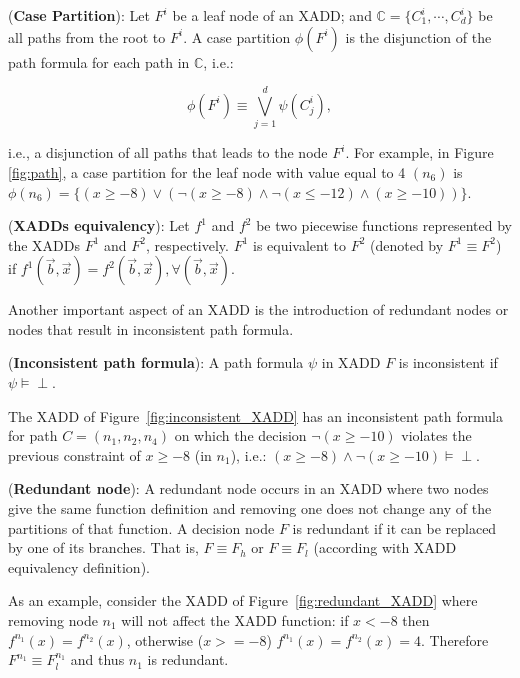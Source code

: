 \documentclass[twoside,11pt]{article}
\newenvironment{mydef}[1][Definition]{\begin{trivlist}
\item[\hskip \labelsep {\bfseries #1}]}{\end{trivlist}}
\begin{document}
\begin{mydef}(\textbf{Case Partition}): Let $F^i$ be a leaf node of an XADD; and $\mathbb{C}= \{C_1^i, \cdots, C_d^i\} $ be all paths from the root to $F^i$. A case partition $\phi(F^i)$ is the disjunction of the path formula for each path in $\mathbb{C}$, i.e.: 

\begin{equation}
\phi(F^i) \equiv \bigvee_{j=1}^{d} \psi(C_j^i), \label{eq:casePartition}
\end{equation} 
\end{mydef}
i.e., a disjunction of all paths that leads to the node $F^i$.
For example,  in Figure \ref{fig:path}, a case partition for the leaf node with value equal to 4 $(n_6)$ is $\phi (n_6)=\{(x \geq -8) \vee (\neg (x \geq -8) \wedge \neg(x \leq -12) \wedge ( x\geq -10))\}$.

\begin{mydef}(\textbf{XADDs equivalency}): Let $f^1$ and $f^2$ be two piecewise functions represented by the XADDs $F^1$ and $F^2$, respectively. $F^1$ is equivalent to $F^2$ (denoted by $F^1 \equiv F^2$) if $f^1(\vec{b}, \vec{x}) = f^2(\vec{b}, \vec{x}), \forall (\vec{b}, \vec{x})$.
\end{mydef}

Another important aspect of an XADD is the introduction of redundant nodes or nodes that result in inconsistent path formula.

\begin{mydef}(\textbf{Inconsistent path formula}):
A path formula $\psi$ in XADD $F$ is inconsistent if $\psi \models \perp$.
\end{mydef}
The XADD of Figure~\ref{fig:inconsistent_XADD} has an inconsistent path formula for path $C=(n_1, n_2, n_4)$ on which the decision $\neg(x \geq -10)$ violates the previous constraint of $x\geq -8$ (in $n_1$), i.e.: $(x \geq -8) \wedge \neg(x \geq -10) \models\perp$.  

\begin{mydef}(\textbf{Redundant node}):
A redundant node occurs in an XADD where two nodes give the same function definition and removing one does not change any of the partitions of that function. A decision node $F$ is redundant if it can be replaced by one of its branches. That is, $F \equiv F_h$ or $F \equiv F_l$ (according with XADD equivalency definition). 
\end{mydef}

As an example, consider the XADD of Figure~\ref{fig:redundant_XADD} where removing node $n_1$ will not affect the XADD function: if $x < - 8$ then $f^{n_1}(x)=f^{n_2}(x)$, otherwise ($x >= - 8$) $f^{n_1}(x)=f^{n_2}(x)=4$. Therefore $F^{n_1} \equiv F^{n_1}_l$ and thus $n_1$ is redundant.  
\end{document}
